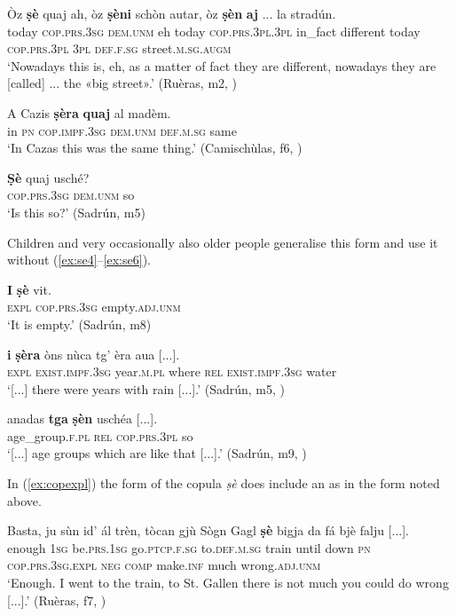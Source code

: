 \ea
\label{ex:se1}
\gll    Òz \textbf{ṣè} quaj ah, òz \textbf{ṣèni} schòn autar, òz \textbf{ṣèn} \textbf{aj} ... la stradún. \\
today \textsc{cop.prs.3sg} \textsc{dem.unm} eh today \textsc{cop.prs.3pl.3pl} in\_fact different today \textsc{cop.prs.3pl} \textsc{3pl} {} \textsc{def.f.sg} street.\textsc{m.sg.augm} \\
\glt `Nowadays this is, eh, as a matter of fact they are different, nowadays they are [called] ... the «big street».' (Ruèras, m2, )
\z

\ea
\label{ex:se2}
\gll    A Cazis \textbf{ṣèra} \textbf{quaj} al madèm.\\
in \textsc{pn} \textsc{cop.impf.3sg} \textsc{dem.unm} \textsc{def.m.sg} same\\
\glt `In Cazas this was the same thing.' (Camischùlas, f6, )
\z

\ea
\label{ex:se3}
\gll \textbf{Ṣè} quaj usché?\\
\textsc{cop.prs.3sg} \textsc{dem.unm} so\\
\glt `Is this so?' (Sadrún, m5)
\z

Children and very occasionally also older people generalise this form and use it without  (\ref{ex:se4}--\ref{ex:se6}).

\ea
\label{ex:se4}
\gll \textbf{I} \textbf{ṣè} vit.\\
\textsc{expl} \textsc{cop.prs.3sg} empty.\textsc{adj.unm}\\
\glt `It is empty.' (Sadrún, m8)
\z

\ea
\label{ex:se5}
\gll [...] \textbf{i} \textbf{ṣèra} òns nùca tg’ èra aua [...].\\
{} \textsc{expl} \textsc{exist.impf.3sg} year.\textsc{m.pl} where \textsc{rel} \textsc{exist.impf.3sg} water \\
\glt `[...] there were years with rain [...].' (Sadrún, m5, )
\z

\ea
\label{ex:se6}
\gll [...] anadas \textbf{tga} \textbf{ṣèn} uschéa [...].\\
{} age\_group.\textsc{f.pl} \textsc{rel} \textsc{cop.prs.3pl} so\\
\glt `[...] age groups which are like that [...].' (Sadrún, m9, )
\z

In (\ref{ex:copexpl}) the form of the copula \textit{ṣè} does include an  as in the  form noted above. 

\ea
\label{ex:copexpl}
\gll Basta, ju sùn id’ ál trèn, tòcan gjù Sògn Gagl \textbf{ṣè} bigja da fá bjè falju [...].   \\
enough \textsc{1sg} be.\textsc{prs.1sg} go.\textsc{ptcp.f.sg} to.\textsc{def.m.sg} train until down \textsc{pn} {} \textsc{cop.prs.3sg.expl} \textsc{neg} \textsc{comp} make.\textsc{inf} much wrong.\textsc{adj.unm}\\
\glt `Enough. I went to the train, to St. Gallen there is not much you could do wrong [...].' (Ruèras, f7, )
\z

